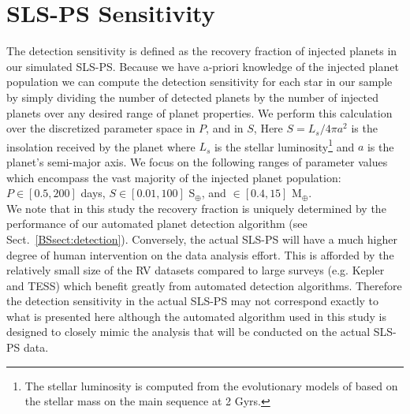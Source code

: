 \section{SLS-PS Sensitivity} \label{BSsect:sensitivity}
The detection sensitivity is defined as the recovery fraction of injected planets in our simulated SLS-PS.
Because we have a-priori knowledge of the injected planet population we can compute the detection sensitivity
for each star in our sample by simply dividing the number of detected planets by the number of injected
planets over any desired range of planet properties. We perform this calculation over the discretized
parameter space in $P$, \msini{} and in $S$, 
Here $S=L_s / 4\pi a^2$ is the insolation received by the planet where $L_s$ is the stellar
luminosity\footnote{The stellar luminosity is computed from the evolutionary models of \cite{baraffe98} 
based on the stellar mass on the main sequence at 2 Gyrs.} and $a$ is the planet's semi-major axis. We 
focus on the
following ranges of parameter values which encompass the vast majority of the injected planet population:
$P \in [0.5,200]$ days, $S \in [0.01,100]$ S$_{\oplus}$, and \msini{} $\in [0.4,15]$ M$_{\oplus}$.  \\

We note that in this
study the recovery fraction is uniquely determined by the performance of our automated planet detection  
algorithm (see Sect.~\ref{BSsect:detection}). Conversely, the actual SLS-PS will have a much higher degree of
human intervention on the data analysis effort. This is afforded by the relatively small size of the RV
datasets compared to large surveys (e.g. Kepler and TESS)
which benefit greatly from automated detection algorithms. Therefore the detection sensitivity in the actual
SLS-PS may not correspond exactly to what is presented here although the automated algorithm used
in this study is designed to closely mimic the analysis that will be conducted on the actual SLS-PS data. \\

